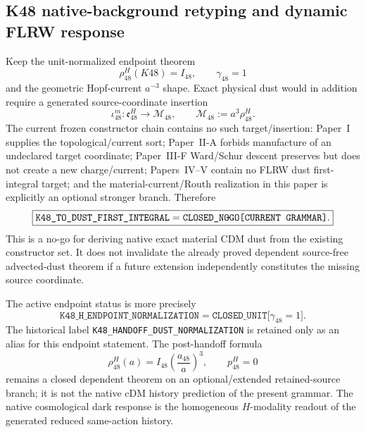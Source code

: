 \documentclass[12pt,a4paper]{article}
\begin{document}
\subsection{K48 native-background retyping and dynamic FLRW response}
\label{p8:sec:v2145-k48-rar-dynamic-retype}

\begin{theorem}
\label{p8:thm:v2145-k48-dust-constructor-nogo}
Keep the unit-normalized endpoint theorem
\[
 \rho_{48}^{H}(K48)=I_{48},\qquad \gamma_{48}=1
\]
and the geometric Hopf-current $a^{-3}$ shape.  Exact physical dust would in
addition require a generated source-coordinate insertion
\[
 \iota_{48}^{m}:\mathfrak e_{48}^{H}\longrightarrow
 \mathcal M_{48},\qquad \mathcal M_{48}:=a^3\rho_{48}^{H}.
\]
The current frozen constructor chain contains no such target/insertion:
Paper~I supplies the topological/current sort; Paper~II-A forbids manufacture of
an undeclared target coordinate; Paper~III-F Ward/Schur descent preserves but
does not create a new charge/current; Papers~IV--V contain no FLRW dust
first-integral target; and the material-current/Routh realization in this paper
is explicitly an optional stronger branch.  Therefore
\[
 \boxed{
 \texttt{K48\_TO\_DUST\_FIRST\_INTEGRAL}
 =\texttt{CLOSED\_NO\!\!-\!GO[CURRENT\ GRAMMAR]}.}
\]
This is a no-go for deriving native exact material CDM dust from the existing
constructor set.  It does not invalidate the already proved dependent
source-free advected-dust theorem if a future extension independently
constitutes the missing source coordinate.
\end{theorem}

\begin{corollary}
\label{p8:cor:v2145-k48-endpoint-versus-dust}
The active endpoint status is more precisely
\[
 \boxed{
 \texttt{K48\_H\_ENDPOINT\_NORMALIZATION}
 =\texttt{CLOSED\_UNIT[}\gamma_{48}=1\texttt{]}.}
\]
The historical label \texttt{K48\_HANDOFF\_DUST\_NORMALIZATION} is retained only
as an alias for this endpoint statement.  The post-handoff formula
\[
 \rho_{48}^{H}(a)=I_{48}\left(\frac{a_{48}}a\right)^3,
 \qquad p_{48}^{H}=0
\]
remains a closed dependent theorem on an optional/extended retained-source
branch; it is not the native cDM history prediction of the present grammar.
The native cosmological dark response is the homogeneous $H$-modality readout
of the generated reduced same-action history.
\end{corollary}
\end{document}
